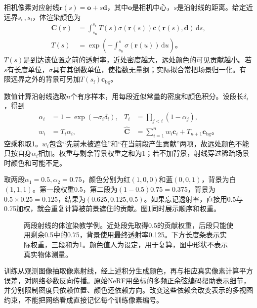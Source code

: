 相机像素对应射线$\bm{r}(s)=\bm{o}+s\bm{d}$，其中$\bm{o}$是相机中心，$s$是沿射线的距离。给定近远界$s_{\mathrm{n}},s_{\mathrm{f}}$，体渲染颜色为
\begin{equation}
 \begin{aligned}
 \bm{C}(\bm{r})
 &=\int_{s_{\mathrm{n}}}^{s_{\mathrm{f}}}
    T(s)\sigma(\bm{r}(s))
    \bm{c}(\bm{r}(s),\bm{d})\,\mathrm{d}s,\\
 T(s)&=\exp\!\left(
     -\int_{s_{\mathrm{n}}}^{s}\sigma(\bm{r}(u))\,\mathrm{d}u
    \right)\text{。}
 \end{aligned}
 \label{eq:vision-nerf-continuous}
\end{equation}
$T(s)$是到达该位置之前的透射率，近处密度越大，远处颜色的可见贡献越小。若$s$有长度单位，$\sigma$具有其倒数单位，使指数无量纲；实际拟合常把场景归一化。有限远界之外的背景可另加$T(s_{\mathrm{f}})\bm{c}_{\mathrm{bg}}$。

数值计算沿射线选取$n$个有序样本，用每段近似常量的密度和颜色积分。设段长$\delta_i$，得到
\begin{equation}
 \begin{aligned}
 \alpha_i&=1-\exp(-\sigma_i\delta_i),&
 T_i&=\prod_{j<i}(1-\alpha_j),\\
 w_i&=T_i\alpha_i,&
 \widehat{\bm{C}}&=\sum_{i=1}^{n}w_i\bm{c}_i
       +T_{n+1}\bm{c}_{\mathrm{bg}}\text{。}
 \end{aligned}
 \label{eq:vision-nerf-discrete}
\end{equation}
空乘积取1。$w_i$包含“先前未被遮住”和“在当前段产生贡献”两项，故远处颜色不能只按自身$\alpha_i$相加。权重与剩余背景权重之和为1；若不加背景，射线穿过稀疏场景时颜色和可能不足。

取两段$\alpha_1=0.5,\alpha_2=0.75$，颜色分别为红$(1,0,0)$和蓝$(0,0,1)$，背景为白$(1,1,1)$。第一段权重0.5，第二段为$(1-0.5)0.75=0.375$，背景为$0.5\times0.25=0.125$，结果为$(0.625,0.125,0.5)$。如果忘记透射率，直接用0.5与0.75加权，就会重复计算被前景遮住的贡献。图\ref{fig:vision-ray-compositing}同时展示顺序和权重。

\begin{figure}[htbp]
 \centering
 
 \caption{两段射线的体渲染教学例。近处段先取得0.5的贡献权重，后段只能使用剩余0.5中的0.75，背景使用最终透射率0.125。下方长度条表示实际权重，三段和为1。颜色值人为设定，用于复算，图中形状不表示真实物体测量。}
 \label{fig:vision-ray-compositing}
\end{figure}

训练从观测图像抽取像素射线，经上述积分生成颜色，再与相应真实像素计算平方误差，对网络参数反向传播。原始NeRF用坐标的多频正余弦编码帮助表示细节，并分别限制密度只依赖位置、颜色还依赖方向。改变这些依赖会改变表示的多视图约束，不能把网络看成直接记忆每个训练像素编号。

